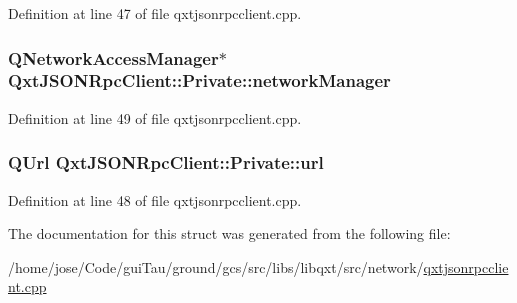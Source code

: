 Definition at line 47 of file qxtjsonrpcclient.\-cpp.

\hypertarget{struct_qxt_j_s_o_n_rpc_client_1_1_private_a43a0336efd270343f1ea4cb024c23171}{
\subsubsection[{network\-Manager}]{\setlength{\rightskip}{0pt plus 5cm}Q\-Network\-Access\-Manager$\ast$ Qxt\-J\-S\-O\-N\-Rpc\-Client\-::\-Private\-::network\-Manager}}\label{struct_qxt_j_s_o_n_rpc_client_1_1_private_a43a0336efd270343f1ea4cb024c23171}


Definition at line 49 of file qxtjsonrpcclient.\-cpp.

\hypertarget{struct_qxt_j_s_o_n_rpc_client_1_1_private_adf7b52dc1d061e3b2afcaf11da4c1529}{
\subsubsection[{url}]{\setlength{\rightskip}{0pt plus 5cm}Q\-Url Qxt\-J\-S\-O\-N\-Rpc\-Client\-::\-Private\-::url}}\label{struct_qxt_j_s_o_n_rpc_client_1_1_private_adf7b52dc1d061e3b2afcaf11da4c1529}


Definition at line 48 of file qxtjsonrpcclient.\-cpp.



The documentation for this struct was generated from the following file\-:\begin{DoxyCompactItemize}
\item 
/home/jose/\-Code/gui\-Tau/ground/gcs/src/libs/libqxt/src/network/\hyperlink{qxtjsonrpcclient_8cpp}{qxtjsonrpcclient.\-cpp}\end{DoxyCompactItemize}
